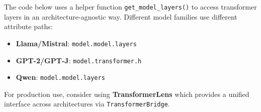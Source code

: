\documentclass[11pt,letterpaper]{article}
\begin{document}
\begin{warningbox}
The code below uses a helper function \texttt{get\_model\_layers()} to access transformer layers in an architecture-agnostic way. Different model families use different attribute paths:
\begin{itemize}[nosep]
  \item \textbf{Llama/Mistral}: \texttt{model.model.layers}
  \item \textbf{GPT-2/GPT-J}: \texttt{model.transformer.h}
  \item \textbf{Qwen}: \texttt{model.model.layers}
\end{itemize}
For production use, consider using \textbf{TransformerLens} which provides a unified interface across architectures via \texttt{TransformerBridge}.
\end{warningbox}
\end{document}
